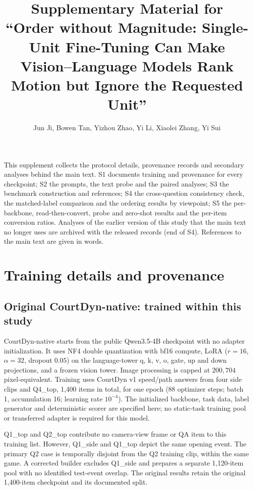 \documentclass[11pt]{article}
\title{Supplementary Material for\\ ``Order without Magnitude: Single-Unit Fine-Tuning Can Make
Vision--Language Models Rank Motion but Ignore the Requested Unit''}
\author{Jun Ji, Bowen Tan, Yizhou Zhao, Yi Li, Xiaolei Zhang, Yi Sui}
\date{}
\begin{document}
\maketitle
\noindent This supplement collects the protocol details, provenance records and
secondary analyses behind the main text. S1 documents training and provenance for
every checkpoint; S2 the prompts, the text probe and the paired analyses; S3 the benchmark
construction and references; S4 the cross-question consistency check, the matched-label
comparison and the ordering results by viewpoint; S5 the per-backbone, read-then-convert,
probe and zero-shot results and the per-item conversion ratios. Analyses of the earlier version of this study that the main
text no longer uses are archived with the released records (end of S4). References to the
main text are given in words.

\section{Training details and provenance}
\label{app:adapters}

\subsection{Original CourtDyn-native: trained within this study}

CourtDyn-native starts from the public Qwen3.5-4B checkpoint with no adapter
initialization. It uses NF4 double quantization with bf16 compute, LoRA
($r=16$, $\alpha=32$, dropout $0.05$) on the language-tower
q, k, v, o, gate, up and down projections, and a frozen vision tower. Image processing
is capped at $200{,}704$ pixel-equivalent. Training uses CourtDyn v1 speed/path
answers from four side clips and Q4\_top, 1,400 items in total, for one epoch
(88 optimizer steps; batch 1, accumulation 16; learning rate $10^{-4}$).
The initialized backbone, task data, label generator and deterministic scorer
are specified here; no static-task training pool or transferred adapter is
required for this model.

Q1\_top and Q2\_top contribute no camera-view frame or QA item to this
training list. However, Q1\_side and Q1\_top depict the same opening event.
The primary Q2 case is temporally disjoint from the Q2 training clip, within
the same game. A corrected builder excludes Q1\_side and prepares a separate
1,120-item pool with no identified test-event overlap. The original results
retain the original 1,400-item checkpoint and its documented split.
\end{document}
